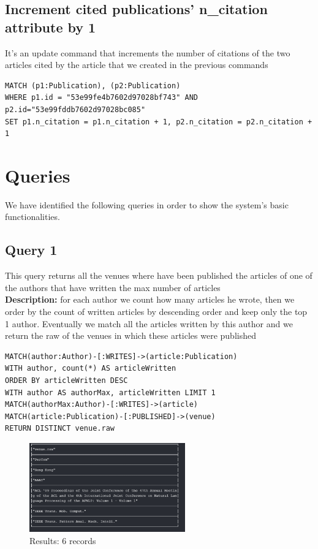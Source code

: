 \documentclass{Configuration_Files/PoliMi3i_thesis}
\begin{document}
\subsection{Increment cited publications' n\_citation attribute by 1}
It's an update command that increments the number of citations of the two articles cited by the article that we created
in the previous commands
\begin{lstlisting}[language=cypher, label=lst:cypher-example]
MATCH (p1:Publication), (p2:Publication)
WHERE p1.id = "53e99fe4b7602d97028bf743" AND p2.id="53e99fddb7602d97028bc085"
SET p1.n_citation = p1.n_citation + 1, p2.n_citation = p2.n_citation + 1
\end{lstlisting}

\section{Queries}
We have identified the following queries in order to show the system's basic functionalities.

\subsection{Query 1}
This query returns all the venues where have been published the articles of one of the authors that have written the max number of articles\\
\textbf{Description:} for each author we count how many articles he wrote, then we order by the count of written articles by descending order and keep only the top 1 author. 
Eventually we match all the articles written by this author and we return the raw of the venues in which these articles were published
\begin{lstlisting}[language=cypher, label=lst:cypher-example]
MATCH(author:Author)-[:WRITES]->(article:Publication)
WITH author, count(*) AS articleWritten
ORDER BY articleWritten DESC
WITH author AS authorMax, articleWritten LIMIT 1
MATCH(authorMax:Author)-[:WRITES]->(article)
MATCH(article:Publication)-[:PUBLISHED]->(venue)
RETURN DISTINCT venue.raw
\end{lstlisting}
\begin{figure}[H]
\centering
\includegraphics[width=0.6\textwidth]{query/query1.PNG}
\caption{Results: 6 records}
\label{fig:query1}
\end{figure}
\end{document}
